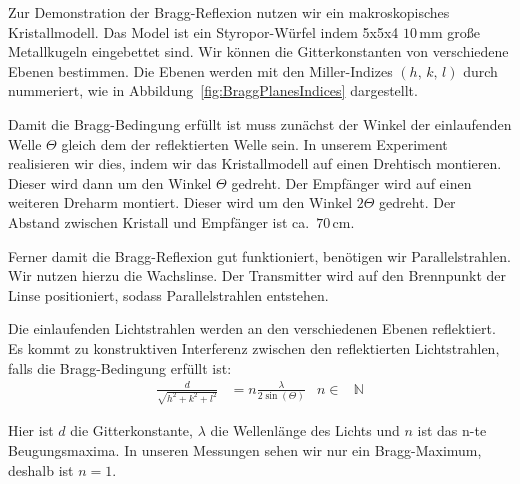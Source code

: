 \documentclass[a4paper,10pt,twocolumn]{article}
\begin{document}
    Zur Demonstration der Bragg-Reflexion nutzen wir ein makroskopisches Kristallmodell.
    Das Model ist ein Styropor-Würfel indem 5x5x4 $10\,\mathrm{mm}$ große Metallkugeln eingebettet sind.
    Wir können die Gitterkonstanten von verschiedene Ebenen bestimmen.
    Die Ebenen werden mit den Miller-Indizes $(h,\,k,\,l)$ durch nummeriert, wie
    in Abbildung~\ref{fig:BraggPlanesIndices} dargestellt.
    

    Damit die Bragg-Bedingung erfüllt ist muss zunächst der Winkel der einlaufenden Welle $\Theta$ gleich
    dem der reflektierten Welle sein.
    In unserem Experiment realisieren wir dies, indem wir das Kristallmodell auf einen Drehtisch montieren.
    Dieser wird dann um den Winkel $\Theta$ gedreht.
    Der Empfänger wird auf einen weiteren Dreharm montiert.
    Dieser wird um den Winkel $2 \Theta$ gedreht.
    Der Abstand zwischen Kristall und Empfänger ist ca.\ $70 \, \mathrm{cm}$.
    
    Ferner damit die Bragg-Reflexion gut funktioniert, benötigen wir Parallelstrahlen.
    Wir nutzen hierzu die Wachslinse.
    Der Transmitter wird auf den Brennpunkt der Linse positioniert,
    sodass Parallelstrahlen entstehen.
    
    Die einlaufenden Lichtstrahlen werden an den verschiedenen Ebenen reflektiert.
    Es kommt zu konstruktiven Interferenz zwischen den reflektierten Lichtstrahlen, falls die Bragg-Bedingung erfüllt
    ist:
    \begin{align}
        \label{eq:BraggAngle}
        \frac{d}{\sqrt{h^2+k^2+l^2}} &= n \frac{\lambda}{2 \sin(\Theta)} & n \in& \mathds{N}
    \end{align}
    
    Hier ist $d$ die Gitterkonstante, $\lambda$ die Wellenlänge des Lichts und $n$ ist das n-te Beugungsmaxima.
    In unseren Messungen sehen wir nur ein Bragg-Maximum, deshalb ist $n = 1$.
    
%    
    
\end{document}
